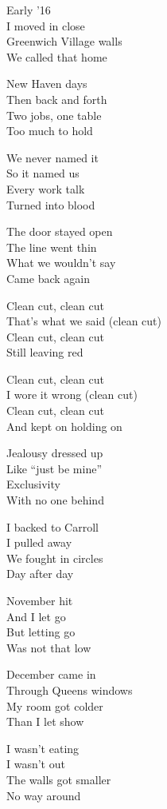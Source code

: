 \begin{lyrics}
Early ’16\\
I moved in close\\
Greenwich Village walls\\
We called that home

New Haven days\\
Then back and forth\\
Two jobs, one table\\
Too much to hold

We never named it\\
So it named us\\
Every work talk\\
Turned into blood

The door stayed open\\
The line went thin\\
What we wouldn’t say\\
Came back again

Clean cut, clean cut\\
That’s what we said (clean cut)\\
Clean cut, clean cut\\
Still leaving red

Clean cut, clean cut\\
I wore it wrong (clean cut)\\
Clean cut, clean cut\\
And kept on holding on

Jealousy dressed up\\
Like “just be mine”\\
Exclusivity\\
With no one behind

I backed to Carroll\\
I pulled away\\
We fought in circles\\
Day after day

November hit\\
And I let go\\
But letting go\\
Was not that low

December came in\\
Through Queens windows\\
My room got colder\\
Than I let show

I wasn’t eating\\
I wasn’t out\\
The walls got smaller\\
No way around


\end{lyrics}
